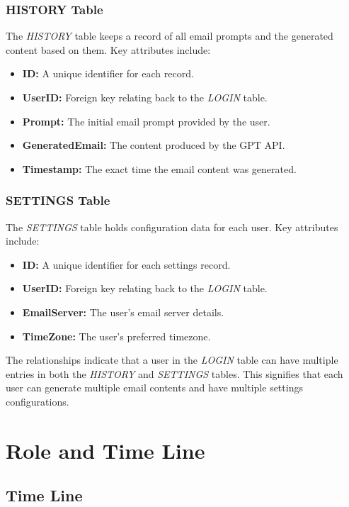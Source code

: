 \subsubsection{HISTORY Table}
The \textit{HISTORY} table keeps a record of all email prompts and the generated content based on them. Key attributes include:
\begin{itemize}
	\item \textbf{ID:} A unique identifier for each record.
	\item \textbf{UserID:} Foreign key relating back to the \textit{LOGIN} table.
	\item \textbf{Prompt:} The initial email prompt provided by the user.
	\item \textbf{GeneratedEmail:} The content produced by the GPT API.
	\item \textbf{Timestamp:} The exact time the email content was generated.
\end{itemize}

\subsubsection{SETTINGS Table}
The \textit{SETTINGS} table holds configuration data for each user. Key attributes include:
\begin{itemize}
	\item \textbf{ID:} A unique identifier for each settings record.
	\item \textbf{UserID:} Foreign key relating back to the \textit{LOGIN} table.
	\item \textbf{EmailServer:} The user's email server details.
	\item \textbf{TimeZone:} The user's preferred timezone.
\end{itemize}

The relationships indicate that a user in the \textit{LOGIN} table can have multiple entries in both the \textit{HISTORY} and \textit{SETTINGS} tables. This signifies that each user can generate multiple email contents and have multiple settings configurations.

\section{Role and Time Line}

\subsection{Time Line}

